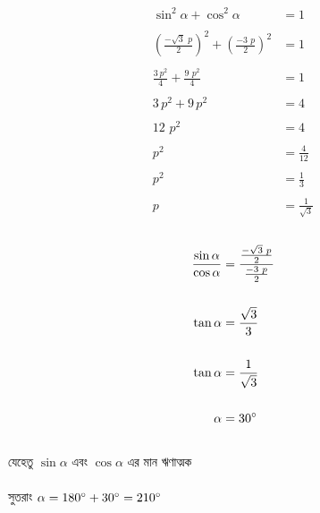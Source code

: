\documentclass{article}
\begin{document}
\begin{multicols}{2}
\begin{align*}
	\sin^2 \alpha+\cos^2\alpha&=1\\
	\\
	\left(\frac{-\sqrt{3}\,\,p}{2}\right)^2+\left(\frac{-3\,\,p}{2}\right)^2&=1\\
	\\
	\frac{3\,p^2}{4}+\frac{9\,\,p^2}{4}&=1\\
	\\
	3\,p^2+9\,p^2&=4\\
	\\
	12\,\,p^2&=4\\
	\\
	p^2&=\frac{4}{12}\\
	\\
	p^2&=\frac{1}{3}\\
	\\
	p&= \frac{1}{\sqrt{3}}
\end{align*}
\\
\begin{align*}
	\frac{\sin \alpha}{\cos \alpha}&=\frac{\frac{-\sqrt{3}\,\,p}{2}}{\frac{-3\,\,p}{2}}\\
	\\
	\tan \alpha&=\frac{\sqrt{3}}{3}\\
	\\
	\tan \alpha&=\frac{1}{\sqrt{3}}\\
	\\
	\alpha&=30\degree \\
\end{align*}
\\

যেহেতু $\sin \alpha$ এবং  $\cos \alpha$ এর মান ঋণাত্মক \\
\\
সুতরাং $\alpha=180\degree+30\degree=210\degree$\\
\end{multicols}
\end{document}

